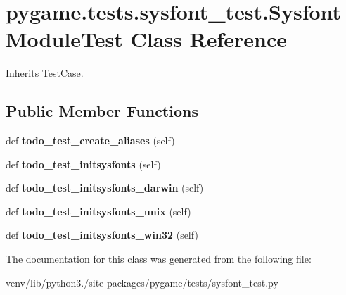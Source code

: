 \hypertarget{classpygame_1_1tests_1_1sysfont__test_1_1_sysfont_module_test}{}\section{pygame.\+tests.\+sysfont\+\_\+test.\+Sysfont\+Module\+Test Class Reference}
\label{classpygame_1_1tests_1_1sysfont__test_1_1_sysfont_module_test}


Inherits Test\+Case.

\subsection*{Public Member Functions}
\begin{DoxyCompactItemize}
\item 
\mbox{\label{classpygame_1_1tests_1_1sysfont__test_1_1_sysfont_module_test_a28196e1e8f7d55ec61f7fa8705bbb2d6}} 
def {\bfseries todo\+\_\+test\+\_\+create\+\_\+aliases} (self)
\item 
\mbox{\label{classpygame_1_1tests_1_1sysfont__test_1_1_sysfont_module_test_ac808d449d932b271d8519f7a5822038d}} 
def {\bfseries todo\+\_\+test\+\_\+initsysfonts} (self)
\item 
\mbox{\label{classpygame_1_1tests_1_1sysfont__test_1_1_sysfont_module_test_ae86bff6f3c56aa539131fa15766777ae}} 
def {\bfseries todo\+\_\+test\+\_\+initsysfonts\+\_\+darwin} (self)
\item 
\mbox{\label{classpygame_1_1tests_1_1sysfont__test_1_1_sysfont_module_test_af29ba4f5983cce92990eae4c0e4914a8}} 
def {\bfseries todo\+\_\+test\+\_\+initsysfonts\+\_\+unix} (self)
\item 
\mbox{\label{classpygame_1_1tests_1_1sysfont__test_1_1_sysfont_module_test_a925b883ef02c4ec4ad855afbabcb70d2}} 
def {\bfseries todo\+\_\+test\+\_\+initsysfonts\+\_\+win32} (self)
\end{DoxyCompactItemize}


The documentation for this class was generated from the following file\+:\begin{DoxyCompactItemize}
\item 
venv/lib/python3./site-\/packages/pygame/tests/sysfont\+\_\+test.\+py\end{DoxyCompactItemize}
